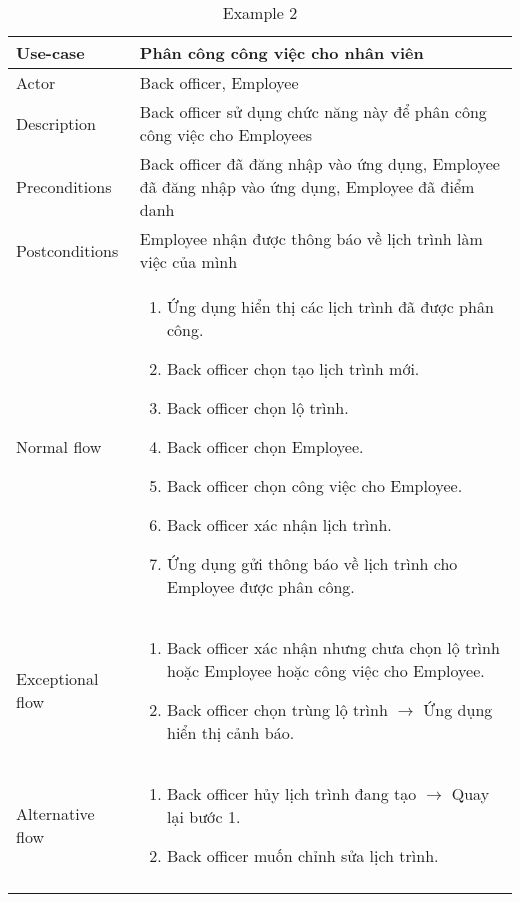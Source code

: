 \begin{table}[H]
    \setcellgapes{10pt}
    \makegapedcells
    \centering
    \begin{tabularx}{\textwidth}{
        !{\vrule width 1.2pt}
        >{\setlength{\hsize}{0.2\textwidth}\raggedright\arraybackslash}X 
        |
        >{\raggedright\arraybackslash}X 
        !{\vrule width 1.2pt}
    }
    \Xhline{1.2pt}
    Use-case & Phân công công việc cho nhân viên \\ 
    \hline
    Actor & Back officer, Employee \\ 
    \hline
    Description & Back officer sử dụng chức năng này để phân công công việc cho Employees \\ 
    \hline
    Preconditions & Back officer đã đăng nhập vào ứng dụng, Employee đã đăng nhập vào ứng dụng, Employee đã điểm danh \\ 
    \hline
    Postconditions & Employee nhận được thông báo về lịch trình làm việc của mình \\
    \hline
    Normal flow &
    \parbox{\hsize}{
    \begin{enumerate}
        \item Ứng dụng hiển thị các lịch trình đã được phân công.
        \item Back officer chọn tạo lịch trình mới.
        \item Back officer chọn lộ trình.
        \item Back officer chọn Employee.
        \item Back officer chọn công việc cho Employee.
        \item Back officer xác nhận lịch trình.
        \item Ứng dụng gửi thông báo về lịch trình cho Employee được phân công.
    \end{enumerate}
    } \\
    \hline
    Exceptional flow & 
    \parbox{\hsize}{
    \begin{enumerate}
        \item Back officer xác nhận nhưng chưa chọn lộ trình hoặc Employee hoặc công việc cho Employee.
        \item Back officer chọn trùng lộ trình $\longrightarrow$ Ứng dụng hiển thị cảnh báo.
    \end{enumerate}
    } \\
    \hline
    Alternative flow &
    \parbox{\hsize}{
    \begin{enumerate}
        \item Back officer hủy lịch trình đang tạo $\longrightarrow$ Quay lại bước 1.
        \item Back officer muốn chỉnh sửa lịch trình.
    \end{enumerate}
    } \\
    \Xhline{1.2pt}
    \end{tabularx}
    \caption{Example 2}
\end{table}